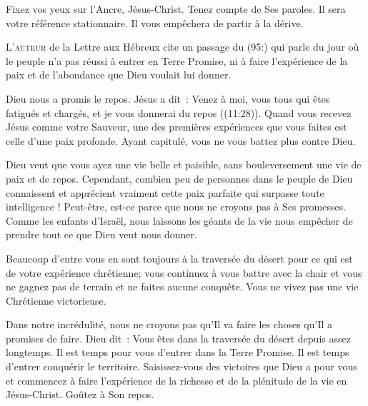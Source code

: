 Fixez vos yeux sur l'Ancre, Jésus-Christ. Tenez compte de Ses paroles.
 Il sera votre référence stationnaire.
 Il vous empêchera de partir à la dérive. 

\dvrule






\lettrine{L}{'auteur} de la Lettre aux Hébreux
 cite un passage du (95:) qui parle du jour où le peuple
 n'a pas réussi à entrer en Terre Promise, ni à faire l'expérience
 de la paix et de l'abondance que Dieu voulait lui donner. 

Dieu nous a promis le repos. Jésus a dit~: 
 \Og Venez à moi, vous tous qui êtes fatigués et chargés,
 et je vous donnerai du repos \Fg{} ((11:28)).
 Quand vous recevez Jésus comme votre Sauveur, une des premières expériences
 que vous faites est celle d'une paix profonde.
 Ayant capitulé, vous ne vous battez plus contre Dieu. 


Dieu veut que vous ayez une vie belle et paisible, sans bouleversement
 \ocadr une vie de paix et de repos.
 Cependant, combien peu de personnes dans le peuple de Dieu connaissent
 et apprécient vraiment cette paix parfaite qui surpasse toute intelligence !
 Peut-être,  est-ce parce que nous ne croyons pas
 à Ses promesses.
 Comme les enfants d'Israël, nous laissons les géants de la vie
 nous empêcher de prendre tout ce que Dieu veut nous donner. 

Beaucoup d'entre vous en sont toujours à la traversée du désert
 pour ce qui est de votre expérience chrétienne;
 vous continuez à vous battre avec la chair et vous ne gagnez pas de terrain
 et ne faites aucune conquête. Vous ne vivez pas
 une vie Chrétienne 
 victorieuse. 

Dans notre incrédulité, nous ne croyons pas qu'Il va faire les choses
 qu'Il a promises 
 de faire.
 Dieu dit~: 
 \Og Vous êtes dans la traversée du désert depuis assez longtemps.
 Il est temps pour vous d'entrer dans la Terre Promise.
 Il est temps d'entrer conquérir le territoire. \Fg{}
 Saisissez-vous 
 des victoires que Dieu a pour vous et commencez à faire l'expérience
 de la richesse et de la plénitude de la vie en Jésus-Christ.
 Goûtez à Son repos. 

